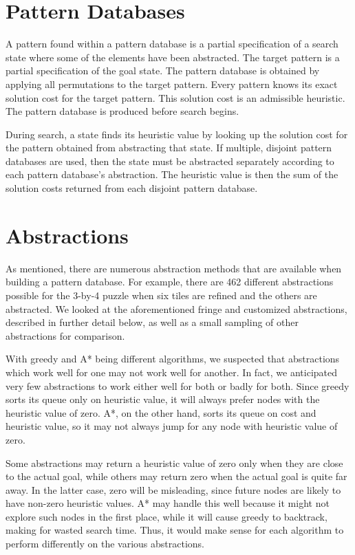\documentclass[letterpaper]{article}
\begin{document}
\section{Pattern Databases}

A pattern found within a pattern database is a partial specification of a search state where some of the elements have been abstracted.  The target pattern is a partial specification of the goal state.  The pattern database is obtained by applying all permutations to the target pattern.  Every pattern knows its exact solution cost for the target pattern.  This solution cost is an admissible heuristic.  The pattern database is produced before search begins.

During search, a state finds its heuristic value by looking up the solution cost for the pattern obtained from abstracting that state.  If multiple, disjoint pattern databases are used, then the state must be abstracted separately according to each pattern database's abstraction.  The heuristic value is then the sum of the solution costs returned from each disjoint pattern database.

\section{Abstractions}

As mentioned, there are numerous abstraction methods that are available when building a pattern database.  For example, there are 462 different abstractions possible for the 3-by-4 puzzle when six tiles are refined and the others are abstracted.  We looked at the aforementioned fringe and customized abstractions, described in further detail below, as well as a small sampling of other abstractions for comparison.

With greedy and A* being different algorithms, we suspected that abstractions which work well for one may not work well for another.  In fact, we anticipated very few abstractions to work either well for both or badly for both.  Since greedy sorts its queue only on heuristic value, it will always prefer nodes with the heuristic value of zero.  A*, on the other hand, sorts its queue on cost and heuristic value, so it may not always jump for any node with heuristic value of zero.  

Some abstractions may return a heuristic value of zero only when they are close to the actual goal, while others may return zero when the actual goal is quite far away.  In the latter case, zero will be misleading, since future nodes are likely to have non-zero heuristic values.  A* may handle this well because it might not explore such nodes in the first place, while it will cause greedy to backtrack, making for wasted search time.  Thus, it would make sense for each algorithm to perform differently on the various abstractions.
\end{document}
